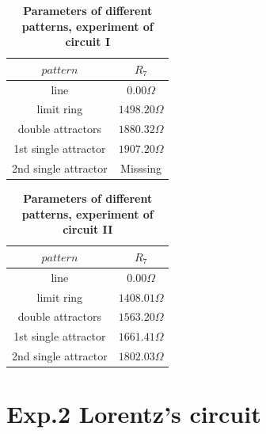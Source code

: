 \documentclass[12pt,a4paper,UTF8]{article}
\begin{document}
            \begin{table}[htbp]
                \centering
                \caption{\textbf{Parameters of different patterns, experiment of circuit I}}
                \label{tab.1.5}
                    \begin{tabular}{cc}
                        \toprule
                        $pattern$	&$R_7$ \\
                        \midrule
                        line	&$0.00 \Omega$	\\
                        limit ring	&$1498.20 \Omega$	\\
                        double attractors	&$1880.32 \Omega$	\\
                        1st single attractor	&$1907.20 \Omega$	\\
                        2nd single attractor	&Misssing	\\
                        \bottomrule
                    \end{tabular}
            \end{table}

            \begin{table}[htbp]
                \centering
                \caption{\textbf{Parameters of different patterns, experiment of circuit II}}
                \label{tab.1.6}
                    \begin{tabular}{cc}
                        \toprule
                        $pattern$	&$R_7$ \\
                        \midrule
                        line	&$0.00 \Omega$	\\
                        limit ring	&$1408.01 \Omega$	\\
                        double attractors	&$1563.20 \Omega$	\\
                        1st single attractor	&$1661.41 \Omega$	\\
                        2nd single attractor	&$1802.03 \Omega$	\\
                        \bottomrule
                    \end{tabular}
            \end{table}



\section{Exp.2 Lorentz's circuit}
\end{document}
